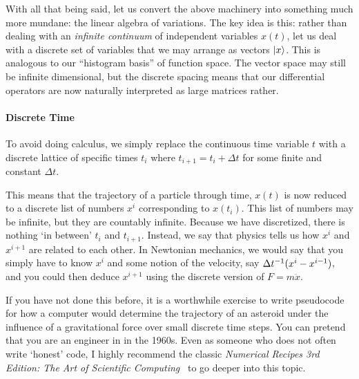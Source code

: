 With all that being said, let us convert the above machinery into something much more mundane: the linear algebra of variations. The key idea is this: rather than dealing with an \emph{infinite continuum} of independent variables $x(t)$, let us deal with a discrete set of variables that we may arrange as vectors $\left|x\right\rangle$. This is analogous to our ``histogram basis'' of function space. The vector space may still be infinite dimensional, but the discrete spacing means that our differential operators are now naturally interpreted as large matrices rather.




\paragraph{Discrete Time} To avoid doing calculus, we simply replace the continuous time variable $t$ with a discrete lattice of specific times $t_i$ where $t_{i+1} = t_i + \Delta t$ for some finite and constant $\Delta t$.

This means that the trajectory of a particle through time, $x(t)$ is now reduced to a discrete list of numbers $x^i$ corresponding to $x(t_i)$. This list of numbers may be infinite, but they are countably infinite. Because we have discretized, there is nothing `in between' $t_i$ and $t_{i+1}$. Instead, we say that physics tells us how $x^{i}$ and $x^{i+1}$ are related to each other. In Newtonian mechanics, we would say that you simply have to know $x^i$ and some notion of the velocity, say $\Delta t^{-1}(x^i-x^{i-1})$, and you could then deduce $x^{i+1}$ using the discrete version of $F=m\ddot{x}$.
\begin{exercise}
If you have not done this before, it is a worthwhile exercise to write pseudocode for how a computer would determine the trajectory of an asteroid under the influence of a gravitational force over small discrete time steps. You can pretend that you are an engineer in  in the 1960s. Even as someone who does not often write `honest' code, I highly recommend the classic \emph{Numerical Recipes 3rd Edition: The Art of Scientific Computing}~\autocite{10.5555/1403886} to go deeper into this topic.
\end{exercise}

